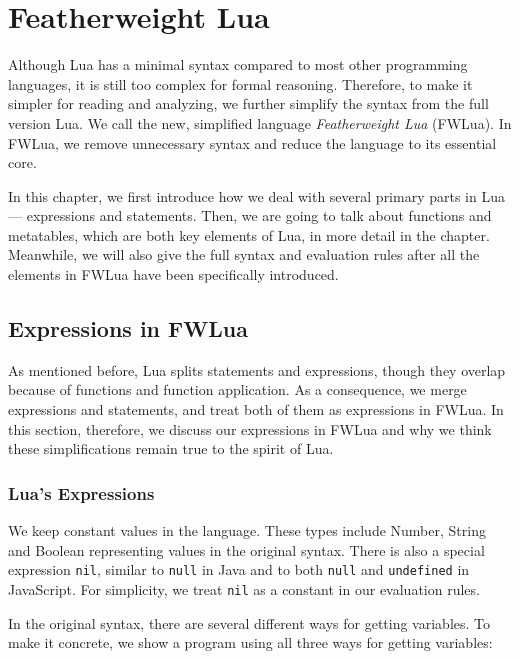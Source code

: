 \newcommand{\abFunction}[2]{{\tt function} ~{#1}~{\tt return}~{#2}~{\tt end}}
\newcommand{\semanticFullRaw}[4]{{#1},{#2} \Downarrow {#3},{#4}}
\newcommand{\semanticFull}[4]{{#1},{#2} \Downarrow {#3}, {#4}}

\chapter{Featherweight Lua}
Although Lua has a minimal syntax compared to most other programming languages, it is still too complex for formal reasoning. Therefore, to make it simpler for reading and analyzing, we further simplify the syntax from the full version Lua. We call the new, simplified language {\it Featherweight Lua} (FWLua). In FWLua, we remove unnecessary syntax and reduce the language to its essential core.

In this chapter, we first introduce how we deal with several primary parts in Lua --- expressions and statements. Then, we are going to talk about functions and metatables, which are both key elements of Lua, in more detail in the chapter. Meanwhile, we will also give the full syntax and evaluation rules after all the elements in FWLua have been specifically introduced.

\section{Expressions in FWLua}
As mentioned before, Lua splits statements and expressions, though they overlap because of functions and function application. As a consequence, we merge expressions and statements, and treat both of them as expressions in FWLua. In this section, therefore, we discuss our expressions in FWLua and why we think these simplifications remain true to the spirit of Lua. 

\subsection{Lua's Expressions}
We keep constant values in the language.
These types include Number, String and Boolean representing values in the original syntax.
There is also a special expression {\tt nil}, similar to {\tt null} in Java and to both {\tt null} and {\tt undefined} in JavaScript.
For simplicity, we treat {\tt nil} as a constant in our evaluation rules.

In the original syntax,
there are several different ways for getting variables.
To make it concrete, we show a program using all three ways for getting variables:

